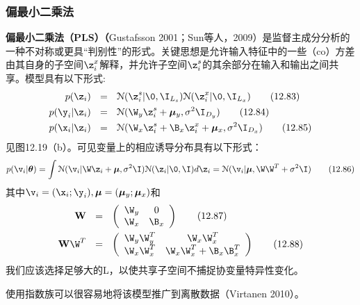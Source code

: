\documentclass[a4paper]{article}
\begin{document}
\subsubsection{偏最小二乘法}
\textbf{偏最小二乘法（PLS）（}Gustafsson 2001；Sun等人，2009）是监督主成分分析的一种不对称或更具“判别性”的形式。关键思想是允许输入特征中的一些（co）方差由其自身的子空间$\z_i^x$解释，并允许子空间$\z_i^s$的其余部分在输入和输出之间共享。模型具有以下形式:
\begin{align}
	p(\z_i)\ \ &=\ \ \mathcal{N}(\z_{i}^s|\0,\I_{L_s})\mathcal{N}(\z_i^x|\0,\I_{L_x})\tag{12.83}\\
	p(\y_i|\z_i)\ \ &=\ \ \mathcal{N}(\W_y\z_{i}^s+\boldsymbol{\mu}_y,\sigma^2\I_{D_y})\tag{12.84}\\
	p(\x_i|\z_i)\ \ &=\ \ \mathcal{N}(\W_x\z_{i}^s+\B_x\z_i^x+\boldsymbol{\mu}_x,\sigma^2\I_{D_x})\tag{12.85}
\end{align}
见图12.19（b）。可见变量上的相应诱导分布具有以下形式： 
\begin{equation}
	p(\v_i|\boldsymbol{\theta})=\int \mathcal{N}(\v_i|\W\z_i+\boldsymbol{\mu},\sigma^2\I)\mathcal{N}(\z_i|\0,\I)d\z_i=\mathcal{N}(\v_i|\boldsymbol{\mu},\W\W^T+\sigma^2\I)\tag{12.86}
\end{equation}
其中$\v_i=(\x_i;\y_i),\boldsymbol{\mu}=(\boldsymbol{\mu}_y;\boldsymbol{\mu}_x)$和
\begin{align}
	\mathbf{W} \ \ &=\ \  \left(
	\begin{array}{cccc}
	\W_y & 0  \\
	\W_x & \B_x \\
	\end{array} \right)\tag{12.87}\\
	\mathbf{W}\W^T \ \ &=\ \  \left(
	\begin{array}{cccc}
	\W_y\W_y^T & \W_x\W_x^T  \\
	\W_x\W_x^T & \W_x\W_x^T+\B_x\B_x^T \\
	\end{array} \right)\tag{12.88}
\end{align}
我们应该选择足够大的L，以使共享子空间不捕捉协变量特异性变化。 

使用指数族可以很容易地将该模型推广到离散数据（Virtanen 2010）。 
\end{document}
